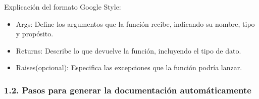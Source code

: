 \documentclass[a4paper,10pt,oneside,spanish,openany]{sphinxmanual}
\begin{document}
\sphinxAtStartPar
Explicación del formato Google Style:
\begin{itemize}
\item {} 
\sphinxAtStartPar
Args: Define los argumentos que la función recibe, indicando su nombre, tipo y propósito.

\item {} 
\sphinxAtStartPar
Returns: Describe lo que devuelve la función, incluyendo el tipo de dato.

\item {} 
\sphinxAtStartPar
Raises(opcional): Especifica las excepciones que la función podría lanzar.

\end{itemize}


\subsubsection{1.2. Pasos para generar la documentación automáticamente}
\end{document}
